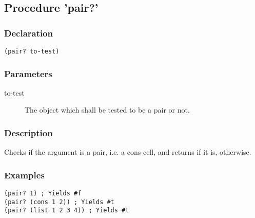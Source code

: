 \subsection{Procedure 'pair?'}
\label{builtins/pairq}

\subsubsection*{Declaration}
\begin{lstlisting}
(pair? to-test)
\end{lstlisting}

\subsubsection*{Parameters}
\begin{description}
	\item[to-test] The object which shall be tested to be a pair or not.
\end{description}

\subsubsection*{Description}
Checks if the argument is a pair, i.e. a cons-cell, and returns \true{} if it is, \false{} otherwise.

\subsubsection*{Examples}
\begin{lstlisting}
(pair? 1) ; Yields #f
(pair? (cons 1 2)) ; Yields #t
(pair? (list 1 2 3 4)) ; Yields #t
\end{lstlisting}
